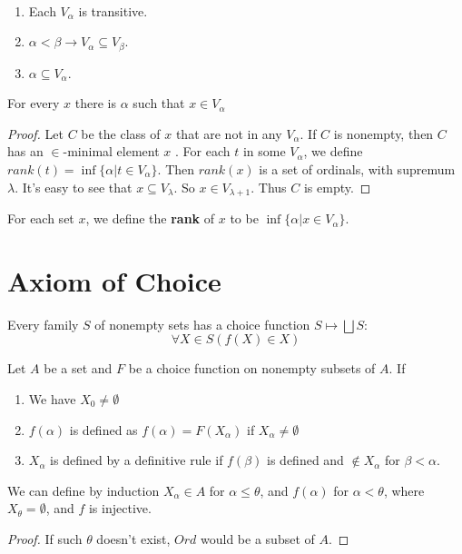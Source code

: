 \documentclass[12pt]{book}
\begin{document}
\begin{lemma}
	\
	\begin{enumerate}
		\item Each $V_\alpha$ is transitive.
		\item $\alpha<\beta\rightarrow V_\alpha\subseteq V_\beta$.
		\item $\alpha\subseteq V_\alpha$.
	\end{enumerate}
\end{lemma}

\begin{lemma}
	For every $x$ there is $\alpha$ such that $x\in V_\alpha$
\end{lemma}
\begin{proof}
	Let $C$ be the class of $x$ that are not in any $V_\alpha$. If $C$ is nonempty, then $C$ has an $\in$-minimal element $x$	. For each $t$ in some $V_\alpha$, we define $rank(t)=\inf\{\alpha|t\in V_\alpha\}$. Then $rank(x)$ is a set of ordinals, with supremum $\lambda$. It's easy to see that $x\subseteq V_\lambda$. So $x\in V_{\lambda+1}$. Thus $C$ is empty.
\end{proof}

\begin{definition}
	For each set $x$, we define the {\bf rank} of $x$ to be $\inf\{\alpha|x\in V_\alpha\}$.
\end{definition}

\chapter{Axiom of Choice}

\begin{axiom}
	Every family $S$ of nonempty sets has a choice function $S\mapsto \bigsqcup S$:
	\begin{equation}
		\forall X\in S(f(X)\in X)
	\end{equation}
\end{axiom}

\begin{lemma}
	Let $A$ be a set and $F$ be a choice function on nonempty subsets of $A$.	
	If
	\begin{enumerate}
		\item We have $X_0\neq\emptyset$ 
		\item $f(\alpha)$ is defined as $f(\alpha)=F(X_\alpha)$ if $X_\alpha\neq\emptyset$
		\item $X_\alpha$ is defined by a definitive rule if $f(\beta)$ is defined and $\not\in X_\alpha$ for $\beta<\alpha$.
	\end{enumerate}
	We can define by induction $X_\alpha\in A$ for $\alpha\leq\theta$, and $f(\alpha)$ for $\alpha<\theta$, where $X_\theta=\emptyset$, and $f$ is injective.
	
	\label{lem:choice}
\end{lemma}
\begin{proof}
	If such $\theta$ doesn't exist, $Ord$ would be a subset of $A$.
\end{proof}
\end{document}
